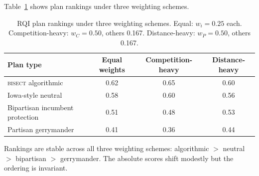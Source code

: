 Table~\ref{tab:rqi-sensitivity} shows plan rankings under three weighting schemes.

\begin{table}[h]
\centering\small
\caption{RQI plan rankings under three weighting schemes.
Equal: $w_i = 0.25$ each. Competition-heavy: $w_C = 0.50$, others 0.167.
Distance-heavy: $w_P = 0.50$, others 0.167.}
\label{tab:rqi-sensitivity}
\begin{tabular}{lccc}
\toprule
Plan type & Equal weights & Competition-heavy & Distance-heavy \\
\midrule
\textsc{bisect} algorithmic & 0.62 & 0.65 & 0.60 \\
Iowa-style neutral & 0.58 & 0.60 & 0.56 \\
Bipartisan incumbent protection & 0.51 & 0.48 & 0.53 \\
Partisan gerrymander & 0.41 & 0.36 & 0.44 \\
\bottomrule
\end{tabular}
\end{table}

Rankings are stable across all three weighting schemes: algorithmic $>$ neutral
$>$ bipartisan $>$ gerrymander.
The absolute scores shift modestly but the ordering is invariant.
